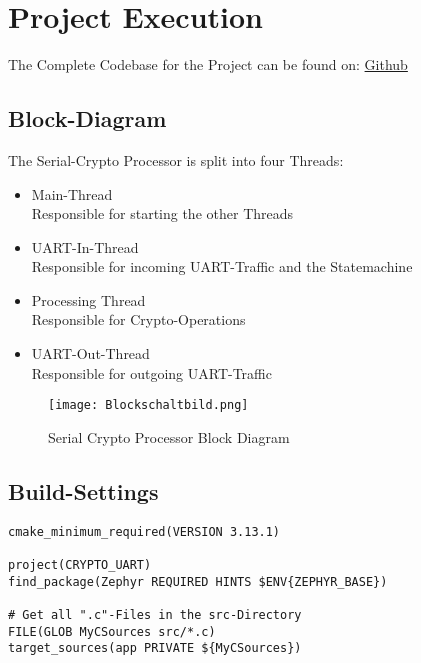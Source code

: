 \pagebreak

\section{Project Execution}

The Complete Codebase for the Project can be found on:
\href{https://github.com/davirieser/zephyr}
{Github}

\subsection{Block-Diagram}

The Serial-Crypto Processor is split into four Threads:
\begin{itemize}
	\item Main-Thread\\
		Responsible for starting the other Threads
	\item UART-In-Thread\\
		Responsible for incoming UART-Traffic and the Statemachine
	\item Processing Thread\\
		Responsible for Crypto-Operations
	\item UART-Out-Thread\\
		Responsible for outgoing UART-Traffic
\end{itemize}

\begin{figure}[!ht]
	\begin{center}
		\texttt{[image: Blockschaltbild.png]}
		\caption{Serial Crypto Processor Block Diagram}
	\end{center}
\end{figure}

\pagebreak

\subsection{Build-Settings}

\begin{lstlisting}[caption=CMakelists.txt]
cmake_minimum_required(VERSION 3.13.1)

project(CRYPTO_UART)
find_package(Zephyr REQUIRED HINTS $ENV{ZEPHYR_BASE})

# Get all ".c"-Files in the src-Directory
FILE(GLOB MyCSources src/*.c)
target_sources(app PRIVATE ${MyCSources})
\end{lstlisting}

